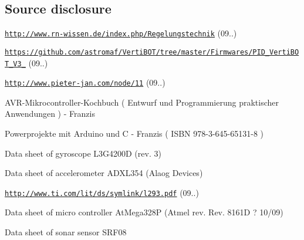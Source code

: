 \par
 

\par


\subsection*{\-Source disclosure}


\begin{DoxyItemize}
\item \href{http://www.rn-wissen.de/index.php/Regelungstechnik}{\tt http\-://www.\-rn-\/wissen.\-de/index.\-php/\-Regelungstechnik} (09..)  
\item \href{https://github.com/astromaf/VertiBOT/tree/master/Firmwares/PID_VertiBOT_V3_2}{\tt https\-://github.\-com/astromaf/\-Verti\-B\-O\-T/tree/master/\-Firmwares/\-P\-I\-D\-\_\-\-Verti\-B\-O\-T\-\_\-\-V3\-\_} (09..)  
\item \href{http://www.pieter-jan.com/node/11}{\tt http\-://www.\-pieter-\/jan.\-com/node/11} (09..)  
\item \-A\-V\-R-\/\-Mikrocontroller-\/\-Kochbuch ( \-Entwurf und \-Programmierung praktischer \-Anwendungen ) -\/ \-Franzis  
\item \-Powerprojekte mit \-Arduino und \-C -\/ \-Franzis ( \-I\-S\-B\-N 978-\/3-\/645-\/65131-\/8 )  
\item \-Data sheet of gyroscope \-L3\-G4200\-D (rev. 3)  
\item \-Data sheet of accelerometer \-A\-D\-X\-L354 (\-Alaog \-Devices)  
\item \href{http://www.ti.com/lit/ds/symlink/l293.pdf}{\tt http\-://www.\-ti.\-com/lit/ds/symlink/l293.\-pdf} (09..)  
\item \-Data sheet of micro controller \-At\-Mega328\-P (\-Atmel rev. \-Rev. 8161\-D ? 10/09)  
\item \-Data sheet of sonar sensor \-S\-R\-F08  
\end{DoxyItemize}